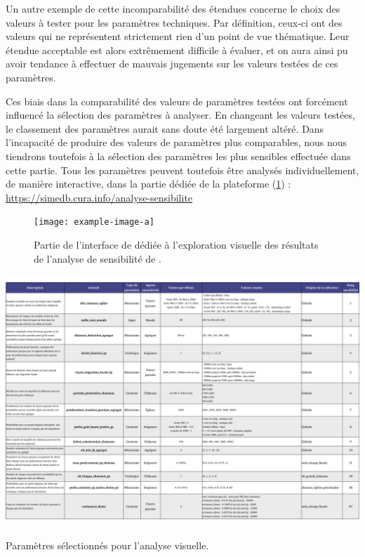 Un autre exemple de cette incomparabilité des étendues concerne le choix des valeurs à tester pour les paramètres techniques.
Par définition, ceux-ci ont des valeurs qui ne représentent strictement rien d'un point de vue thématique.
Leur étendue acceptable est alors extrêmement difficile à évaluer, et on aura ainsi pu avoir tendance à effectuer de mauvais jugements sur les valeurs testées de ces paramètres.

Ces biais dans la comparabilité des valeurs de paramètres testées ont forcément influencé la sélection des paramètres à analyser.
En changeant les valeurs testées, le classement des paramètres aurait sans doute été largement altéré.
Dans l'incapacité de produire des valeurs de paramètres plus comparables, nous nous tiendrons toutefois à la sélection des paramètres \og les plus sensibles\fg{} effectuée dans cette partie.
Tous les paramètres peuvent toutefois être analysés individuellement, de manière interactive, dans la partie dédiée de la plateforme \simedb{} (\cref{fig:screenshot-simedb-sensib}) : \href{https://simedb.cura.info/analyse-sensibilite}{https://simedb.cura.info/analyse-sensibilite}

\begin{figure}[H]
	\centering
	\texttt{[image: example-image-a]}
	\caption[Partie de l'interface de \simedb{} dédiée à l'exploration visuelle des résultats de l'analyse de sensibilité de \simfeodal{}.]{Partie de l'interface de \simedb{} dédiée à l'exploration visuelle des résultats de l'analyse de sensibilité de \simfeodal{}.}
	\label{fig:screenshot-simedb-sensib}
\end{figure}

\clearpage
\begin{table}[H]\vspace*{-1em}
\centering
\includegraphics[width=\textheight, angle=90, origin=c]{img/Parametres.pdf}
\caption{Paramètres sélectionnés pour l'analyse visuelle.}
\label{tab:selection-parametres-anavis}
\end{table}

